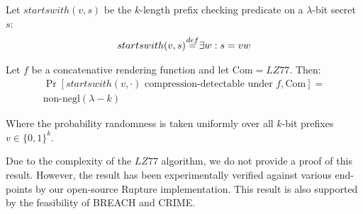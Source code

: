 \documentclass[conference, letterpaper, 10pt]{IEEEtran}
\newcommand\defeq{\stackrel{\mathclap{\normalfont\mbox{def}}}{=}}
\begin{document}
Let $startswith(v, s)$ be the $k$-length prefix checking predicate on a
$\lambda$-bit secret $s$:
\begin{equation*}
    startswith(v, s) \defeq \exists w: s = v w
\end{equation*}

Let $f$ be a concatenative rendering function and let $\textrm{Com} = LZ77$. Then:
\begin{align*}
\Pr[startswith(v, \cdot) \textrm{ compression-detectable under } f, \textrm{Com}] =\\ \text{non-negl}(\lambda - k)
\end{align*}

Where the probability randomness is taken uniformly over all $k$-bit prefixes $v \in \{0, 1\}^k$.

Due to the complexity of the $LZ77$ algorithm, we do not provide a proof of this result. However, the
result has been experimentally verified against various end-points by our open-source Rupture implementation.
This result is also supported by the feasibility of BREACH and CRIME.
\end{document}
